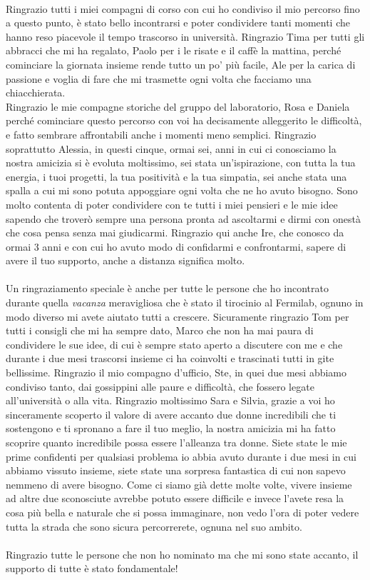 \paragraph{}
Ringrazio tutti i miei compagni di corso con cui ho condiviso il mio percorso fino a questo punto, è stato bello incontrarsi e poter condividere tanti momenti che hanno reso piacevole il tempo trascorso in università.
Ringrazio Tima per tutti gli abbracci che mi ha regalato, Paolo per i le risate e il caffè la mattina, perché cominciare la giornata insieme rende tutto un po' più facile, Ale per la carica di passione e voglia di fare che mi trasmette ogni volta che facciamo una chiacchierata.\\
Ringrazio le mie compagne storiche del gruppo del laboratorio, Rosa e Daniela perché cominciare questo percorso con voi ha decisamente alleggerito le difficoltà, e fatto sembrare affrontabili anche i momenti meno semplici. 
Ringrazio soprattutto Alessia, in questi cinque, ormai sei, anni in cui ci conosciamo la nostra amicizia si è evoluta moltissimo, sei stata un'ispirazione, con tutta la tua energia, i tuoi progetti, la tua positività e la tua simpatia, sei anche stata una spalla a cui mi sono potuta appoggiare ogni volta che ne ho avuto bisogno.
Sono molto contenta di poter condividere con te tutti i miei pensieri e le mie idee sapendo che troverò sempre una persona pronta ad ascoltarmi e dirmi con onestà che cosa pensa senza mai giudicarmi.
Ringrazio qui anche Ire, che conosco da ormai 3 anni e con cui ho avuto modo di confidarmi e confrontarmi, sapere di avere il tuo supporto, anche a distanza significa molto.
\paragraph{}
Un ringraziamento speciale è anche per tutte le persone che ho incontrato durante quella \textit{vacanza} meravigliosa che è stato il tirocinio al Fermilab, ognuno in modo diverso mi avete aiutato tutti a crescere.
Sicuramente ringrazio Tom per tutti i consigli che mi ha sempre dato, Marco che non ha mai paura di condividere le sue idee, di cui è sempre stato aperto a discutere con me e che durante i due mesi trascorsi insieme ci ha coinvolti e trascinati tutti in gite bellissime.
Ringrazio il mio compagno d'ufficio, Ste, in quei due mesi abbiamo condiviso tanto, dai gossippini alle paure e difficoltà, che fossero legate all'università o alla vita. 
Ringrazio moltissimo Sara e Silvia, grazie a voi ho sinceramente scoperto il valore di avere accanto due donne incredibili che ti sostengono e ti spronano a fare il tuo meglio, la nostra amicizia mi ha fatto scoprire quanto incredibile possa essere l'alleanza tra donne. 
Siete state le mie prime confidenti per qualsiasi problema io abbia avuto durante i due mesi in cui abbiamo vissuto insieme, siete state una sorpresa fantastica di cui non sapevo nemmeno di avere bisogno.
Come ci siamo già dette molte volte, vivere insieme ad altre due sconosciute avrebbe potuto essere difficile e invece l'avete resa la cosa più bella e naturale che si possa immaginare, non vedo l'ora di poter vedere tutta la strada che sono sicura percorrerete, ognuna nel suo ambito.
\paragraph{}
Ringrazio tutte le persone che non ho nominato ma che mi sono state accanto, il supporto di tutte è stato fondamentale!
